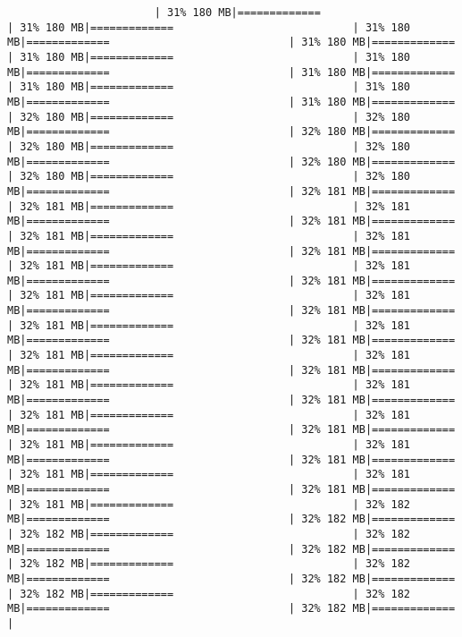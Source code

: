 \documentclass[
]{article}
\begin{document}
\begin{verbatim}
                       | 31% 180 MB|=============                            | 31% 180 MB|=============                            | 31% 180 MB|=============                            | 31% 180 MB|=============                            | 31% 180 MB|=============                            | 31% 180 MB|=============                            | 31% 180 MB|=============                            | 31% 180 MB|=============                            | 31% 180 MB|=============                            | 31% 180 MB|=============                            | 32% 180 MB|=============                            | 32% 180 MB|=============                            | 32% 180 MB|=============                            | 32% 180 MB|=============                            | 32% 180 MB|=============                            | 32% 180 MB|=============                            | 32% 180 MB|=============                            | 32% 180 MB|=============                            | 32% 181 MB|=============                            | 32% 181 MB|=============                            | 32% 181 MB|=============                            | 32% 181 MB|=============                            | 32% 181 MB|=============                            | 32% 181 MB|=============                            | 32% 181 MB|=============                            | 32% 181 MB|=============                            | 32% 181 MB|=============                            | 32% 181 MB|=============                            | 32% 181 MB|=============                            | 32% 181 MB|=============                            | 32% 181 MB|=============                            | 32% 181 MB|=============                            | 32% 181 MB|=============                            | 32% 181 MB|=============                            | 32% 181 MB|=============                            | 32% 181 MB|=============                            | 32% 181 MB|=============                            | 32% 181 MB|=============                            | 32% 181 MB|=============                            | 32% 181 MB|=============                            | 32% 181 MB|=============                            | 32% 181 MB|=============                            | 32% 181 MB|=============                            | 32% 181 MB|=============                            | 32% 181 MB|=============                            | 32% 181 MB|=============                            | 32% 181 MB|=============                            | 32% 181 MB|=============                            | 32% 181 MB|=============                            | 32% 181 MB|=============                            | 32% 182 MB|=============                            | 32% 182 MB|=============                            | 32% 182 MB|=============                            | 32% 182 MB|=============                            | 32% 182 MB|=============                            | 32% 182 MB|=============                            | 32% 182 MB|=============                            | 32% 182 MB|=============                            | 32% 182 MB|=============                            | 32% 182 MB|=============                            | 32% 182 MB|=============                            | 
\end{verbatim}
\end{document}
